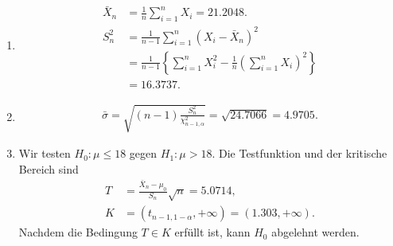 \solution
\begin{enumerate}
    \item \begin{align*}
            \bar X_n &= \frac{1}{n} \sum_{i=1}^{n} X_i = 21.2048.\\
            S^{2}_n &= \frac{1}{n-1} \sum_{i=1}^{n} \left( X_i - \bar X_n \right)^{2} \\
            &= \frac{1}{n-1} \left\{ \sum_{i=1}^{n} X_i^{2} - \frac{1}{n} \left( \sum_{i=1}^{n} X_i \right)^2 \right\} \\
            &= 16.3737. 
        \end{align*}
    \item \begin{align*}
            \bar \sigma = \sqrt{ (n-1) \frac{S^{2}_{n}}{ \chi^{2}_{n-1,\alpha}} } = \sqrt{ 24.7066 } = 4.9705.
        \end{align*}

    \item Wir testen $H_{0}: \mu \leq 18$ gegen $H_1: \mu > 18$. Die Testfunktion und der 
        kritische Bereich sind
        \begin{align*}
            T &= \frac{\bar X_{n} - \mu_{0}}{ S_{n}} \sqrt{n} = 5.0714, \\
            K &= \left( t_{n-1,1-\alpha}, +\infty \right) = ( 1.303, +\infty).
        \end{align*}
        Nachdem die Bedingung $T\in K$ erfüllt ist, kann $H_0$ abgelehnt werden. 
\end{enumerate}


